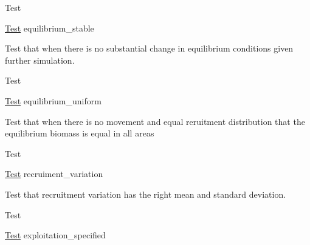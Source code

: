 \begin{DoxyRefDesc}{Test}
\item[\hyperlink{test__test000001}{Test}]equilibrium\-\_\-stable\end{DoxyRefDesc}


Test that when there is no substantial change in equilibrium conditions given further simulation.

\begin{DoxyRefDesc}{Test}
\item[\hyperlink{test__test000002}{Test}]equilibrium\-\_\-uniform\end{DoxyRefDesc}


Test that when there is no movement and equal reruitment distribution that the equilibrium biomass is equal in all areas

\begin{DoxyRefDesc}{Test}
\item[\hyperlink{test__test000003}{Test}]recruiment\-\_\-variation\end{DoxyRefDesc}


Test that recruitment variation has the right mean and standard deviation.

\begin{DoxyRefDesc}{Test}
\item[\hyperlink{test__test000004}{Test}]exploitation\-\_\-specified\end{DoxyRefDesc}


